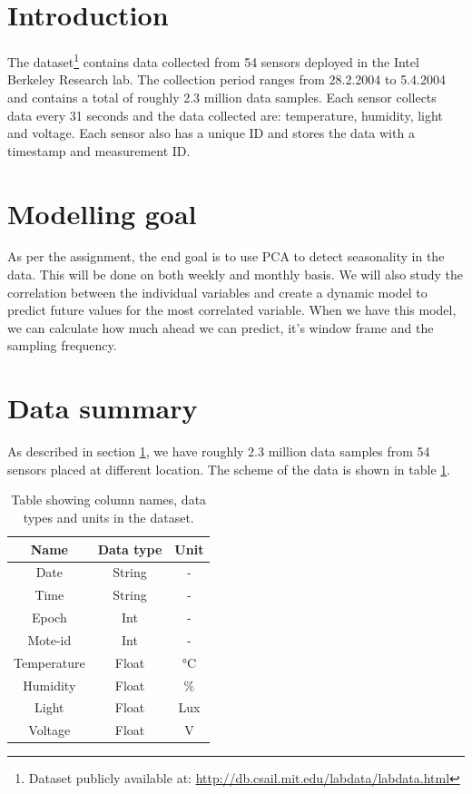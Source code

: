 \documentclass[a4paper,11pt]{article}
\begin{document}
	
	\section{Introduction}
	\label{section:intro}
		The dataset\footnote{Dataset publicly available at: \url{http://db.csail.mit.edu/labdata/labdata.html}} contains data collected from 54 sensors deployed in the Intel Berkeley Research lab. The collection period ranges from 28.2.2004 to 5.4.2004 and contains a total of roughly 2.3 million data samples. Each sensor collects data every 31 seconds and the data collected are: temperature, humidity, light and voltage. Each sensor also has a unique ID and stores the data with a timestamp and measurement ID.
	
	\section{Modelling goal}
	\label{section:goal}
		As per the assignment, the end goal is to use PCA to detect seasonality in the data. This will be done on both weekly and monthly basis. We will also study the correlation between the individual variables and create a dynamic model to predict future values for the most correlated variable. When we have this model, we can calculate how much ahead we can predict, it's window frame and the sampling frequency.
	
	\section{Data summary}
	\label{section:data}
		As described in section \ref{section:intro}, we have roughly 2.3 million data samples from 54 sensors placed at different location. The scheme of the data is shown in table \ref{table:scheme}.
		\begin{table}[H]
			\centering
			\begin{tabular}{|c|c|c|}
				\hline
				Name & Data type & Unit \\
				\hline
				Date & String & - \\
				\hline
				Time & String & - \\
				\hline
				Epoch & Int & - \\
				\hline
				Mote-id & Int & - \\
				\hline
				Temperature & Float & °C \\
				\hline
				Humidity & Float & \% \\
				\hline
				Light & Float & Lux \\
				\hline
				Voltage & Float & V\\
				\hline
			\end{tabular}
			\caption{Table showing column names, data types and units in the dataset.}
			\label{table:scheme}
		\end{table}
	
\end{document}
